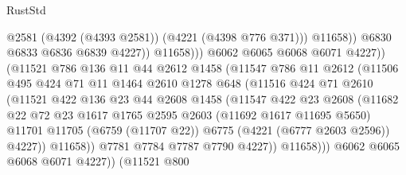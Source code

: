 \begin{lexlean}{RustStd}
\begin{coremodule}
                                      @2581
                                      (@4392 (@4393 @2581))
                                      (@4221 (@4398 @776 @371)))
                                    @11658))
                                @6830
                                @6833
                                @6836
                                @6839
                                @4227))
                            @11658)))
                      @6062
                      @6065
                      @6068
                      @6071
                      @4227))
                  (@11521
                    @786
                    @136
                    @11
                    @44
                    @2612
                    @1458
                    (@11547
                      @786
                      @11
                      @2612
                      (@11506
                        @495
                        @424
                        @71
                        @11
                        @1464
                        @2610
                        @1278
                        @648
                        (@11516
                          @424
                          @71
                          @2610
                          (@11521
                            @422
                            @136
                            @23
                            @44
                            @2608
                            @1458
                            (@11547
                              @422
                              @23
                              @2608
                              (@11682
                                @22
                                @72
                                @23
                                @1617
                                @1765
                                @2595
                                @2603
                                (@11692 @1617 @11695 @5650)
                                @11701
                                @11705
                                (@6759 (@11707 @22))
                                @6775
                                (@4221 (@6777 @2603 @2596))
                                @4227))
                            @11658))
                        @7781
                        @7784
                        @7787
                        @7790
                        @4227))
                    @11658)))
              @6062
              @6065
              @6068
              @6071
              @4227))
          (@11521
            @800

\end{coremodule}
\end{lexlean}

